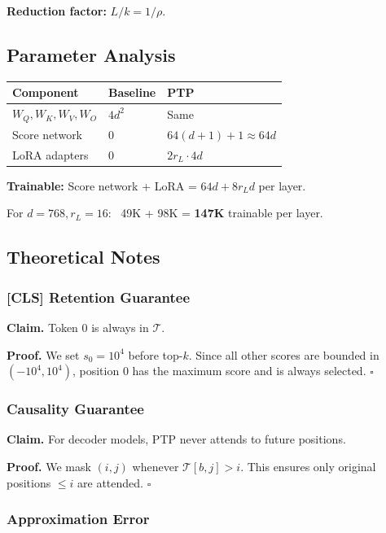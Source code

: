 \textbf{Reduction factor:} $L / k = 1 / \rho$.

\subsection{Parameter Analysis}

\begin{table}[H]
\centering
\small
\begin{tabular}{lll}
\toprule
\textbf{Component} & \textbf{Baseline} & \textbf{PTP} \\
\midrule
$W_Q, W_K, W_V, W_O$ & $4 d^2$ & Same \\
Score network & 0 & $64 (d + 1) + 1 \approx 64 d$ \\
LoRA adapters & 0 & $2 r_L \cdot 4 d$ \\
\bottomrule
\end{tabular}
\end{table}

\textbf{Trainable:} Score network + LoRA = $64 d + 8 r_L d$ per layer.

For $d = 768, r_L = 16$: ~49K + 98K = \textbf{147K} trainable per layer.

\subsection{Theoretical Notes}

\subsubsection{[CLS] Retention Guarantee}

\textbf{Claim.} Token 0 is always in $\mathcal{T}$.

\textbf{Proof.} We set $s_0 = 10^4$ before top-$k$. Since all other scores are 
bounded in $(-10^4, 10^4)$, position 0 has the maximum score and is always 
selected. $\square$

\subsubsection{Causality Guarantee}

\textbf{Claim.} For decoder models, PTP never attends to future positions.

\textbf{Proof.} We mask $(i, j)$ whenever $\mathcal{T}[b, j] > i$. This ensures 
only original positions $\leq i$ are attended. $\square$

\subsubsection{Approximation Error}

